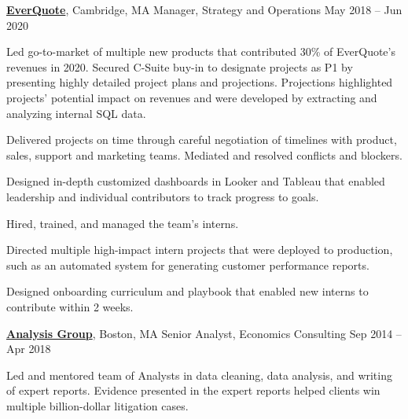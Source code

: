 \documentclass[letterpaper,10pt,oneside]{article}
\begin{document}
\begin{body}
\href{http://www.everquote.com/}
{\textbf{EverQuote}},
Cambridge, MA
\GapNoBreak
Manager, Strategy and Operations
\hfill
May 2018 -- Jun 2020
\begin{flushleft}

\BulletItem Led go-to-market of multiple new products that contributed 30\% of EverQuote's revenues in 2020.
\vspace{0.5em} \SubBulletItem Secured C-Suite buy-in to designate projects as P1 by presenting highly detailed project plans and projections. Projections highlighted projects' potential impact on revenues and were developed by extracting and analyzing internal SQL data.

\vspace{0.5em} \SubBulletItem Delivered projects on time through careful negotiation of timelines with product, sales, support and marketing teams. Mediated and resolved conflicts and blockers. 

\vspace{0.5em} \SubBulletItem Designed in-depth customized dashboards in Looker and Tableau that enabled leadership and individual contributors to track progress to goals. 

\vspace{0.75em}
\BulletItem Hired, trained, and managed the team's interns. 

\vspace{0.5em} \SubBulletItem Directed multiple high-impact intern projects that were deployed to production, such as an automated system for generating customer performance reports.

\vspace{0.5em} \SubBulletItem Designed onboarding curriculum and playbook that enabled new interns to contribute within 2 weeks. 

\end{flushleft}

\vspace{0.75em}
\href{http://www.analysisgroup.com/}
{\textbf{Analysis Group}},
Boston, MA
\GapNoBreak
Senior Analyst,
Economics Consulting
\hfill
Sep 2014 --
Apr 2018
\begin{flushleft}

\BulletItem Led and mentored team of Analysts in data cleaning, data analysis, and writing of expert reports. Evidence presented in the expert reports helped clients win multiple billion-dollar litigation cases.

\end{flushleft}


\end{body}
\end{document}
